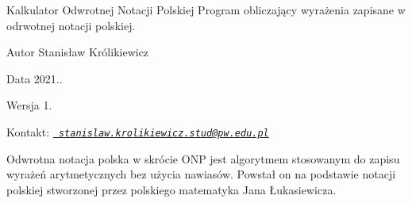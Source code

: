 \begin{DoxyParagraph}{Kalkulator Odwrotnej Notacji Polskiej}
Program obliczający wyrażenia zapisane w odrwotnej notacji polskiej. 
\end{DoxyParagraph}
\begin{DoxyAuthor}{Autor}
Stanisław Królikiewicz 
\end{DoxyAuthor}
\begin{DoxyDate}{Data}
2021.. 
\end{DoxyDate}
\begin{DoxyVersion}{Wersja}
1. 
\end{DoxyVersion}
\begin{DoxyParagraph}{Kontakt\+:}
{\itshape \href{mailto:stanislaw.krolikiewicz.stud@pw.edu.pl}{\texttt{ stanislaw.\+krolikiewicz.\+stud@pw.\+edu.\+pl}}} 
\end{DoxyParagraph}
Odwrotna notacja polska w skrócie ONP jest algorytmem stosowanym do zapisu wyrażeń arytmetycznych bez użycia nawiasów. Powstał on na podstawie notacji polskiej stworzonej przez polskiego matematyka Jana Łukasiewicza. 